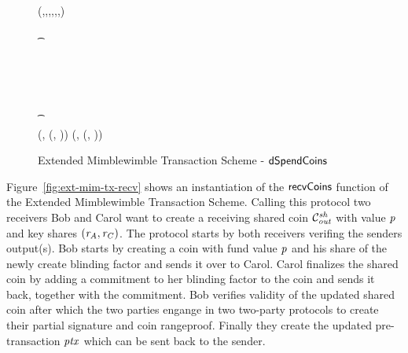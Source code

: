 \begin{landscape}
\begin{figure}
{{        \varPreTx \opFunResult \\
        \procCreatePreTx{\varMsg}{\funArray{\varCoinInp}}{\funArray{\varCoinOutAlice}}{\funArray{\varProofAlice}}{\varSigContext}{\funArray{\funGen{\varNonceAlice}}}{\cnstEmptySet}{\varTime} \< \< \\
        \< \sendmessageright*{\varPreTx} \< \\
        \< \< (\varMsg,\varInputs,\varOutputs,\varProofs,\varSigContext,\varCommits,\funStar{\varTime}) \opFunResult \varPreTx \\
        \< \< \pcif \procVerfProof{\varProofs[0]}{\varOutputs[0]}  \opOr \varTime \opNotEq \funStar{\varTime} \\
        \< \< \t \pcreturn \cnstFalsum \\
        \< \< \varSigContext \opFunResult \procSetupCtx{\varSigContext}{\funGen{\varSecKeyCarol}}{\funGen{\varNonceCarol}} \\
        \< \< \varPreTx \opFunResult \procCreatePreTx{\varMsg}{\varInputs}{\varOutputs \opConc \varCoinOutCarol}{\varProof \opConc \varProofCarol}{\varSigContext}{\varCommits \opConc \funGen{\varNonceCarol}}{\cnstEmptySet}{\varTime} \\
        \< \sendmessageleft*{\varPreTx} \< \\
        \pcif {}  \< \< \\
        \t \pcreturn \cnstFalsum \< \< \\
        \pcreturn (\varPreTx, (\varSecKeyAlice, \varNonceAlice)) \< \< \pcreturn (\varPreTx, (\varSecKeyCarol, \varNonceCarol)) \\
        }
        }
        \caption{Extended Mimblewimble Transaction Scheme - $\mathsf{dSpendCoins}$ \label{fig:ext-mim-tx-spend}}
    \end{figure}
\end{landscape}
\restoregeometry

Figure~\ref{fig:ext-mim-tx-recv} shows an instantiation of the $\mathsf{recvCoins}$ function of the Extended Mimblewimble Transaction Scheme. Calling this protocol two receivers Bob and Carol want to create a
receiving shared coin $\mathcal{C}_{\mathit{out}}^{\mathit{sh}}$ with value $\mathit{p}$ and key shares $(\mathit{r}_{\mathit{A}}, \mathit{r}_{\mathit{C}})$. The protocol starts by both receivers verifing the senders output(s). Bob starts by creating a coin with
fund value $\mathit{p}$ and his share of the newly create blinding factor and sends it over to Carol. Carol finalizes the shared coin by adding a commitment to her blinding factor to the coin and sends it back, together
with the commitment. Bob verifies validity of the updated shared coin after which the two parties engange in two two-party protocols to create their partial signature and coin rangeproof. Finally they create the updated
pre-transaction $\mathit{ptx}$ which can be sent back to the sender.

